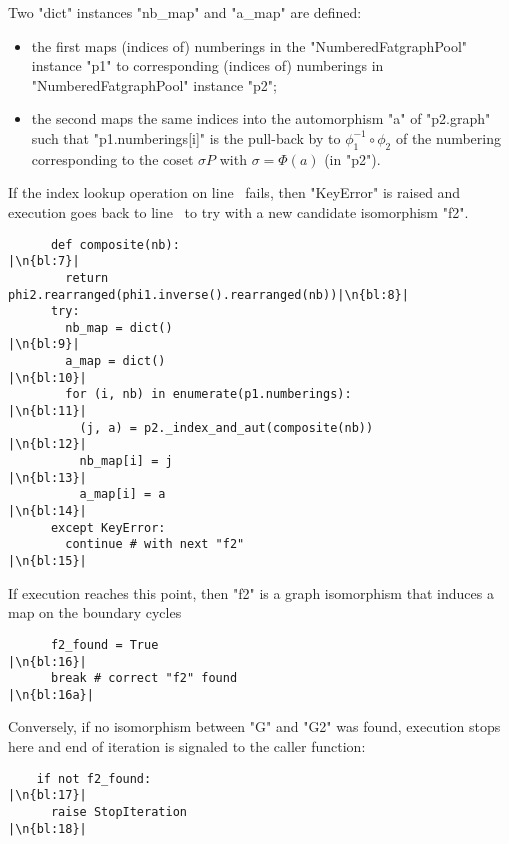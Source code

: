 Two "dict" instances "nb_map" and "a_map" are defined:
\begin{itemize}
\item the first maps (indices of) numberings in the
  "NumberedFatgraphPool" instance "p1" to corresponding
  (indices of) numberings in "NumberedFatgraphPool"
  instance "p2";
\item the second maps the same indices into the automorphism "a" of
  "p2.graph" such that "p1.numberings[i]" is the pull-back by
  to $\phi_1^{-1} \circ \phi_2$ of the numbering corresponding to the
  coset $\sigma P$ with $\sigma = \Phi(a)$ (in "p2").
\end{itemize}
If the index lookup operation on line~ fails, then
"KeyError" is raised and execution goes back to line~ to try
with a new candidate isomorphism "f2".
\begin{lstlisting}
      def composite(nb):                                     |\n{bl:7}|
        return phi2.rearranged(phi1.inverse().rearranged(nb))|\n{bl:8}|
      try:
        nb_map = dict()                                      |\n{bl:9}|
        a_map = dict()                                       |\n{bl:10}|
        for (i, nb) in enumerate(p1.numberings):             |\n{bl:11}|
          (j, a) = p2._index_and_aut(composite(nb))          |\n{bl:12}|
          nb_map[i] = j                                      |\n{bl:13}|
          a_map[i] = a                                       |\n{bl:14}|
      except KeyError:
        continue # with next "f2"                            |\n{bl:15}|
\end{lstlisting}
If execution reaches this point, then "f2" is a graph
isomorphism that induces a map on the boundary cycles
\begin{lstlisting}
      f2_found = True                                        |\n{bl:16}|
      break # correct "f2" found                             |\n{bl:16a}|
\end{lstlisting}
Conversely, if no isomorphism between "G" and "G2" was found,
execution stops here and end of iteration is signaled to the caller
function:
\begin{lstlisting}
    if not f2_found:                                         |\n{bl:17}|
      raise StopIteration                                    |\n{bl:18}|

\end{lstlisting}

